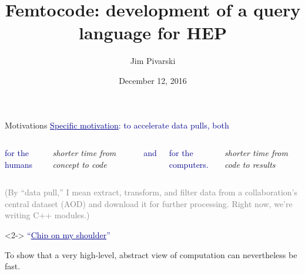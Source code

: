 \documentclass{beamer}
\title[2016-12-12-femtocode-at-diana]{Femtocode: development of a query \\ language for HEP}
\author{Jim Pivarski}
\institute{Princeton -- DIANA}
\date{December 12, 2016}
\begin{document}

\begin{frame}
  \titlepage
\end{frame}



\begin{frame}{Motivations}
\textcolor{darkblue}{\underline{Specific motivation}: to accelerate data pulls, both}

\begin{center}
\begin{columns}

\centering \textcolor{darkblue}{for the humans}

{\it shorter time from concept to code}

\centering \textcolor{darkblue}{and}

\centering \textcolor{darkblue}{for the computers.}

{\it shorter time from code to results}

\end{columns}
\end{center}

\vspace{0.2 cm}
\textcolor{gray}{(By ``data pull,'' I mean extract, transform, and filter data from a collaboration's central dataset (AOD) and download it for further processing. Right now, we're writing C++ modules.)}

\vspace{0.5 cm}
\begin{uncoverenv}<2->
\textcolor{darkblue}{``\underline{Chip on my shoulder}''}

\vspace{0.2 cm}
To show that a very high-level, abstract view of computation can nevertheless be fast.
\end{uncoverenv}
\end{frame}
\end{document}
